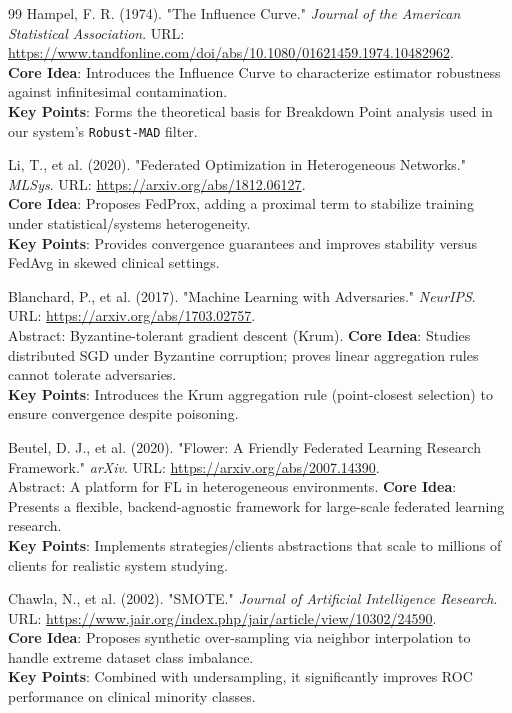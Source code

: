 \documentclass[10pt, a4paper, twocolumn]{article}
\begin{document}
\begin{thebibliography}{99}
 Hampel, F. R. (1974). "The Influence Curve." \textit{Journal of the American Statistical Association}. URL: \url{https://www.tandfonline.com/doi/abs/10.1080/01621459.1974.10482962}. \\
\textbf{Core Idea}: Introduces the Influence Curve to characterize estimator robustness against infinitesimal contamination. \\
\textbf{Key Points}: Forms the theoretical basis for Breakdown Point analysis used in our system's \texttt{Robust-MAD} filter.

 Li, T., et al. (2020). "Federated Optimization in Heterogeneous Networks." \textit{MLSys}. URL: \url{https://arxiv.org/abs/1812.06127}. \\
\textbf{Core Idea}: Proposes FedProx, adding a proximal term to stabilize training under statistical/systems heterogeneity. \\
\textbf{Key Points}: Provides convergence guarantees and improves stability versus FedAvg in skewed clinical settings.

 Blanchard, P., et al. (2017). "Machine Learning with Adversaries." \textit{NeurIPS}. URL: \url{https://arxiv.org/abs/1703.02757}. \\ Abstract: Byzantine-tolerant gradient descent (Krum).
\textbf{Core Idea}: Studies distributed SGD under Byzantine corruption; proves linear aggregation rules cannot tolerate adversaries. \\
\textbf{Key Points}: Introduces the Krum aggregation rule (point-closest selection) to ensure convergence despite poisoning.

 Beutel, D. J., et al. (2020). "Flower: A Friendly Federated Learning Research Framework." \textit{arXiv}. URL: \url{https://arxiv.org/abs/2007.14390}. \\ Abstract: A platform for FL in heterogeneous environments.
\textbf{Core Idea}: Presents a flexible, backend-agnostic framework for large-scale federated learning research. \\
\textbf{Key Points}: Implements strategies/clients abstractions that scale to millions of clients for realistic system studying.

 Chawla, N., et al. (2002). "SMOTE." \textit{Journal of Artificial Intelligence Research}. URL: \url{https://www.jair.org/index.php/jair/article/view/10302/24590}. \\
\textbf{Core Idea}: Proposes synthetic over-sampling via neighbor interpolation to handle extreme dataset class imbalance. \\
\textbf{Key Points}: Combined with undersampling, it significantly improves ROC performance on clinical minority classes.


\end{thebibliography}
\end{document}
